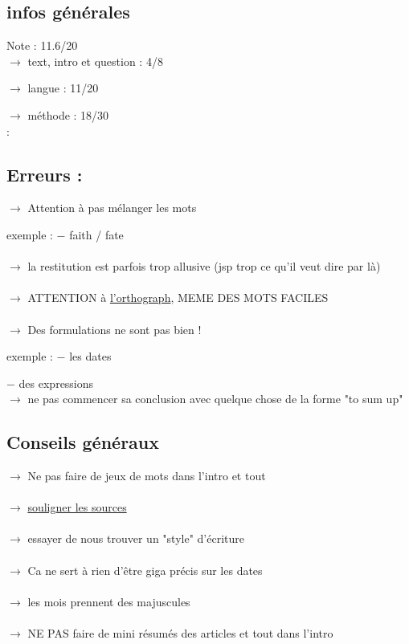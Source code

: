 \documentclass{book}
\begin{document}
\begin{tcolorbox}[width={14cm},colback={yellow!20!white},title={\textbf{Commentaire générale sur ce DM}},colbacktitle=red!40!white,coltitle=black]    

\end{tcolorbox}

\subsection{infos générales}

Note : 11.6/20 \\

$\rightarrow$ text, intro et question : 4/8

$\rightarrow$ langue : 11/20

$\rightarrow$ méthode : 18/30 \\:


\subsection{Erreurs :}

$\rightarrow$ Attention à pas mélanger les mots

exemple : $-$ faith / fate \\ \\
$\rightarrow$ la restitution est parfois trop allusive (jsp trop ce qu'il veut dire par là) \\ \\
$\rightarrow$ ATTENTION à \underline{l'orthograph}, MEME DES MOTS FACILES \\ \\
$\rightarrow$ Des formulations ne sont pas bien !

exemple : $-$ les dates

\hspace{1.5 cm} $-$ des expressions \\

$\rightarrow$ ne pas commencer sa conclusion avec quelque chose de la forme "to sum up"

\subsection{Conseils généraux}

$\rightarrow$ Ne pas faire de jeux de mots dans l'intro et tout \\ \\
$\rightarrow$ \underline{souligner les sources} \\ \\
$\rightarrow$ essayer de nous trouver un "style" d'écriture \\ \\
$\rightarrow$ Ca ne sert à rien d'être giga précis sur les dates \\ \\
$\rightarrow$ les mois prennent des majuscules \\ \\
$\rightarrow$ NE PAS faire de mini résumés des articles et tout dans l'intro \\ \\
\end{document}
